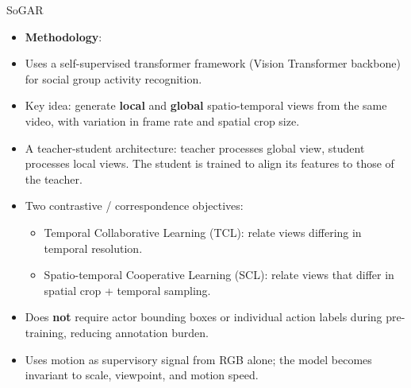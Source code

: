 \documentclass{beamer}
\begin{document}
\begin{frame}{SoGAR}
    \begin{itemize}
        \item \textbf{Methodology}:
        \item Uses a self-supervised transformer framework (Vision Transformer backbone) for social group activity recognition.
        \item Key idea: generate \textbf{local} and \textbf{global} spatio-temporal views from the same video, with variation in frame rate and spatial crop size.
        \item A teacher-student architecture: teacher processes global view, student processes local views. The student is trained to align its features to those of the teacher.
        \item Two contrastive / correspondence objectives:
              \begin{itemize}
                  \item Temporal Collaborative Learning (TCL): relate views differing in temporal resolution.
                  \item Spatio-temporal Cooperative Learning (SCL): relate views that differ in spatial crop + temporal sampling.
              \end{itemize}
        \item Does \textbf{not} require actor bounding boxes or individual action labels during pre-training, reducing annotation burden.
        \item Uses motion as supervisory signal from RGB alone; the model becomes invariant to scale, viewpoint, and motion speed.

    \end{itemize}
\end{frame}
\end{document}
